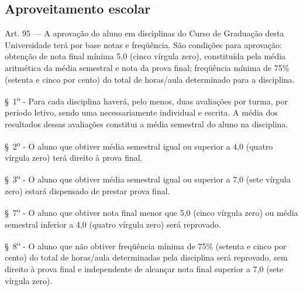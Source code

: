 \subsection{Aproveitamento escolar}
\begin{quoting}
    Art. 95 –-- A aprovação do aluno em disciplinas do Curso de Graduação desta Universidade terá por base notas e freqüência. São condições para aprovação: obtenção de nota final mínima 5,0 (cinco vírgula zero), constituída pela média aritmética da média semestral e nota da prova final; freqüência mínima de 75\% (setenta e cinco por cento) do total de horas/aula determinado para a disciplina.


    \S~1\textsuperscript{o} - Para cada disciplina haverá, pelo menos, duas avaliações por turma, por período letivo, sendo uma necessariamente individual e escrita. A média dos resultados dessas avaliações constitui a média semestral do aluno na disciplina.

    \S~2\textsuperscript{o} - O aluno que obtiver média semestral igual ou superior a 4,0 (quatro vírgula zero) terá direito à prova final.

    \S~3\textsuperscript{o} - O aluno que obtiver média semestral igual ou superior a 7,0 (sete vírgula zero) estará dispensado de prestar prova final.

    \S~7\textsuperscript{o} - O aluno que obtiver nota final menor que 5,0 (cinco vírgula zero) ou média semestral inferior a 4,0 (quatro vírgula zero) será reprovado.

    \S~8\textsuperscript{o} - O aluno que não obtiver freqüência mínima de 75\% (setenta e cinco por cento) do total de horas/aula determinadas pela disciplina será reprovado, sem direito à prova final e independente de alcançar nota final superior a 7,0 (sete vírgula zero).
\end{quoting}
